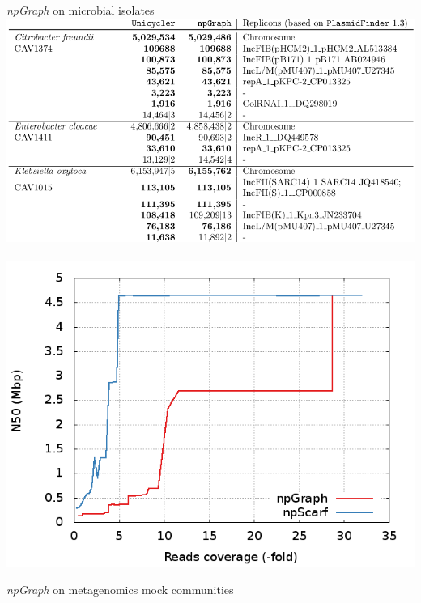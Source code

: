 \documentclass{beamer}
\begin{document}
\begin{frame}{\emph{npGraph} on microbial isolates}
\centering
 \includegraphics[height=.6\textheight]{figures/npgraph_uni.png}  
~
 \includegraphics[height=.6\textheight]{figures/response.png}  
\end{frame}
\begin{frame}{\emph{npGraph} on metagenomics mock communities}
\begin{figure}[!hpb]
%
\hfill
{}%
\end{figure}
\end{frame}
\end{document}

